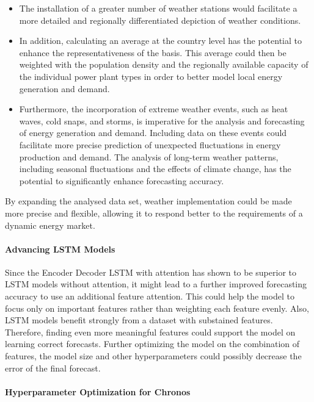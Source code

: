 \documentclass[a4paper]{article}
\begin{document}
\begin{itemize}
\item
  The installation of a greater number of weather stations would
  facilitate a more detailed and regionally differentiated depiction of
  weather conditions.
\item
  In addition, calculating an average at the country level has the
  potential to enhance the representativeness of the basis. This average
  could then be weighted with the population density and the regionally
  available capacity of the individual power plant types in order to
  better model local energy generation and demand.
\item
  Furthermore, the incorporation of extreme weather events, such as heat
  waves, cold snaps, and storms, is imperative for the analysis and
  forecasting of energy generation and demand. Including data on these
  events could facilitate more precise prediction of unexpected
  fluctuations in energy production and demand. The analysis of
  long-term weather patterns, including seasonal fluctuations and the
  effects of climate change, has the potential to significantly enhance
  forecasting accuracy.
\end{itemize}

By expanding the analysed data set, weather implementation could be made
more precise and flexible, allowing it to respond better to the
requirements of a dynamic energy market.

    \paragraph{Advancing LSTM Models}\label{advancing-lstm-models}

Since the Encoder Decoder LSTM with attention has shown to be superior
to LSTM models without attention, it might lead to a further improved
forecasting accuracy to use an additional feature attention. This could
help the model to focus only on important features rather than weighting
each feature evenly. Also, LSTM models benefit strongly from a dataset
with substained features. Therefore, finding even more meaningful
features could support the model on learning correct forecasts. Further
optimizing the model on the combination of features, the model size and
other hyperparameters could possibly decrease the error of the final
forecast.

    \paragraph{Hyperparameter Optimization for
Chronos}\label{hyperparameter-optimization-for-chronos}
\end{document}
